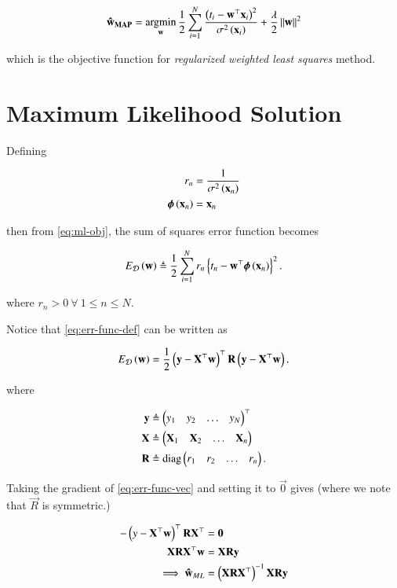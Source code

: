 \documentclass[journal,12pt,twocolumn]{IEEEtran}
\DeclareMathOperator*{\argmin}{arg\!\min}
\begin{document}
\begin{equation}
     \vec{\hat{w}_{MAP}} = \argmin_{\vec{w}}\frac{1}{2}\sum_{i=1}^{N}\frac{\brak{t_i-\vec{w}^\top\vec{x}_i}^2}{\sigma^2\brak{\vec{x}_i}} + \frac{\lambda}{2}\norm{\vec{w}}^2
     \label{eq:map-reg}
\end{equation}

which is the objective function for \emph{regularized weighted least squares}
method.

\section{Maximum Likelihood Solution}

Defining

\begin{align}
     r_n &= \frac{1}{\sigma^2\left(\boldsymbol{\mathbf{x}}_n\right)} \label{eq:rn-def} \\
     \boldsymbol{\mathbf{\phi}}\left(\boldsymbol{\mathbf{x}}_n\right) &= \boldsymbol{\mathbf{x}}_n \label{eq:phi-def}
\end{align}

then from \eqref{eq:ml-obj}, the sum of squares error function becomes

\begin{equation}
     E_{\mathcal{D}}\left(\boldsymbol{\mathbf{w}}\right) \triangleq \frac{1}{2}\sum_{i=1}^{N}r_n\left\{t_n-\boldsymbol{\mathbf{w}}^\top\boldsymbol{\mathbf{\phi}}\left(\boldsymbol{\mathbf{x}}_n\right)\right\}^2.
     \label{eq:err-func-def}
\end{equation}

where \(r_n > 0\ \forall\ 1 \le n \le N\).

Notice that \eqref{eq:err-func-def} can be written as

\begin{equation}
     E_{\mathcal{D}}\left(\boldsymbol{\mathbf{w}}\right) = \frac{1}{2}\left(\boldsymbol{\mathbf{y}}-\boldsymbol{\mathbf{X}}^\top\boldsymbol{\mathbf{w}}\right)^\top\boldsymbol{\mathbf{R}}\left(\boldsymbol{\mathbf{y}}-\boldsymbol{\mathbf{X}}^\top\boldsymbol{\mathbf{w}}\right).
     \label{eq:err-func-vec}
\end{equation}

where

\begin{align}
     \boldsymbol{\mathbf{y}} &\triangleq \begin{pmatrix}y_1 & y_2 & \ldots & y_N\end{pmatrix}^\top \label{eq:y-def} \\
     \boldsymbol{\mathbf{X}} &\triangleq \begin{pmatrix}\boldsymbol{\mathbf{X}}_1 & \boldsymbol{\mathbf{X}}_2 & \ldots & \boldsymbol{\mathbf{X}}_n\end{pmatrix} \label{eq:X-def} \\
     \boldsymbol{\mathbf{R}} &\triangleq \mathrm{diag}\begin{pmatrix}r_1 & r_2 & \ldots & r_n\end{pmatrix}. \label{eq:R-def}
\end{align}

Taking the gradient of \eqref{eq:err-func-vec} and setting it to \(\vec{0}\)
gives (where we note that \(\vec{R}\) is symmetric.)

\begin{align}
     -\left(y-\boldsymbol{\mathbf{X}}^\top\boldsymbol{\mathbf{w}}\right)^\top\boldsymbol{\mathbf{RX}}^\top &= \boldsymbol{\mathbf{0}} \\
     \boldsymbol{\mathbf{XRX}}^\top\boldsymbol{\mathbf{w}} &= \boldsymbol{\mathbf{XRy}} \\
     \implies \boldsymbol{\mathbf{\hat{w}}}_{ML} &= \left(\boldsymbol{\mathbf{XRX}}^\top\right)^{-1}\boldsymbol{\mathbf{XRy}}
     \label{eq:w-ml-sol}
\end{align}
\end{document}
